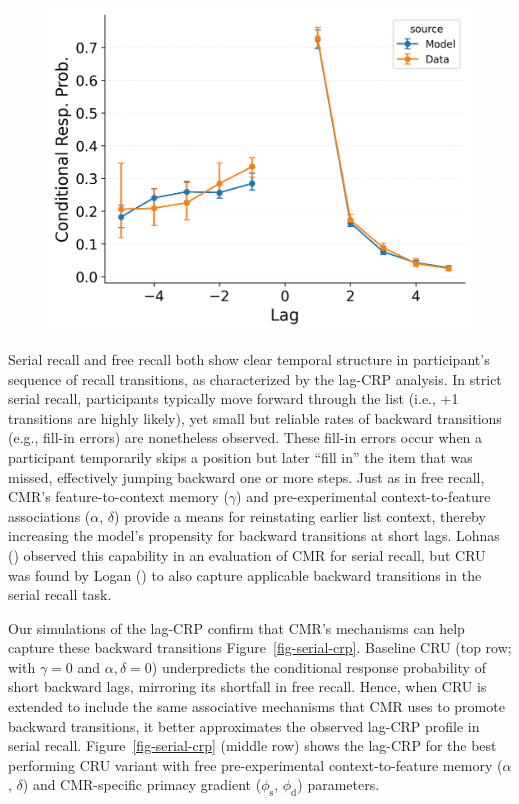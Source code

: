 \documentclass[
  man,
  floatsintext,
  longtable,
  nolmodern,
  notxfonts,
  notimes,
  draftfirst,
  colorlinks=true,linkcolor=blue,citecolor=blue,urlcolor=blue]{apa7}
\begin{document}
\begin{figure}
\begin{minipage}{0.33\linewidth}
\includegraphics{figures/Gordon2021_BaseCMR_Confusable_Fitting_crp_LL7.png}\end{minipage}%

\end{figure}%

Serial recall and free recall both show clear temporal structure in
participant's sequence of recall transitions, as characterized by the
lag-CRP analysis. In strict serial recall, participants typically move
forward through the list (i.e., +1 transitions are highly likely), yet
small but reliable rates of backward transitions (e.g., fill-in errors)
are nonetheless observed. These fill-in errors occur when a participant
temporarily skips a position but later ``fill in'' the item that was
missed, effectively jumping backward one or more steps. Just as in free
recall, CMR's feature-to-context memory (\(\gamma\)) and
pre-experimental context-to-feature associations (\(\alpha\),
\(\delta\)) provide a means for reinstating earlier list context,
thereby increasing the model's propensity for backward transitions at
short lags. Lohnas () observed
this capability in an evaluation of CMR for serial recall, but CRU was
found by Logan () to also capture
applicable backward transitions in the serial recall task.

Our simulations of the lag-CRP confirm that CMR's mechanisms can help
capture these backward transitions Figure~\ref{fig-serial-crp}. Baseline
CRU (top row; with \(\gamma=0\) and \(\alpha, \delta=0\)) underpredicts
the conditional response probability of short backward lags, mirroring
its shortfall in free recall. Hence, when CRU is extended to include the
same associative mechanisms that CMR uses to promote backward
transitions, it better approximates the observed lag-CRP profile in
serial recall. Figure~\ref{fig-serial-crp} (middle row) shows the
lag-CRP for the best performing CRU variant with free pre-experimental
context-to-feature memory (\(\alpha\), \(\delta\)) and CMR-specific
primacy gradient (\(\phi_\text{s}\), \(\phi_\text{d}\)) parameters.
\end{document}
